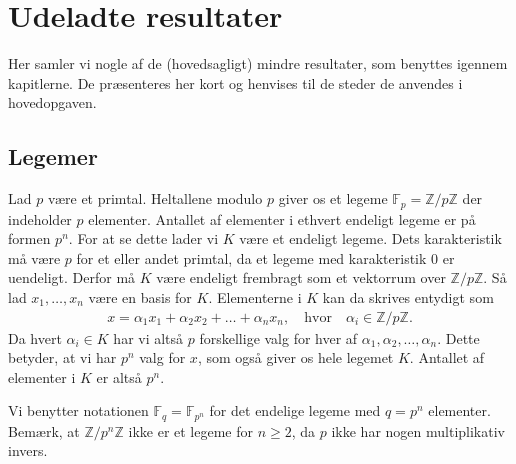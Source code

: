 \appendix

\chapter{Udeladte resultater}
Her samler vi nogle af de (hovedsagligt) mindre resultater, som benyttes igennem kapitlerne. De præsenteres her kort og henvises til de steder de anvendes i hovedopgaven.

\section{Legemer}
\label{appendiks_legemer}
Lad $p$ være et primtal. Heltallene modulo $p$ giver os et legeme $\mathbb{F}_p = \mathbb{Z}/p\mathbb{Z}$ der indeholder $p$ elementer. Antallet af elementer i ethvert endeligt legeme er på formen $p^n$. For at se dette lader vi $K$ være et endeligt legeme. Dets karakteristik må være $p$ for et eller andet primtal, da et legeme med karakteristik $0$ er uendeligt. Derfor må $K$ være endeligt frembragt som et vektorrum over $\mathbb{Z}/p\mathbb{Z}$. Så lad $x_1, \ldots, x_n$ være en basis for $K$. Elementerne i $K$ kan da skrives entydigt som
\begin{align*}
	x= \alpha_1 x_1 + \alpha_2 x_2 + \ldots + \alpha_n x_n, \quad \text{hvor} \quad \alpha_i \in \mathbb{Z}/p\mathbb{Z}.
\end{align*}
Da hvert $\alpha_i \in K$ har vi altså $p$ forskellige valg for hver af $\alpha_1, \alpha_2, \ldots, \alpha_n$. Dette betyder, at vi har $p^n$ valg for $x$, som også giver os hele legemet $K$. Antallet af elementer i $K$ er altså $p^n$. 

Vi benytter notationen $\mathbb{F}_q = \mathbb{F}_{p^n}$ for det endelige legeme med $q=p^n$ elementer. Bemærk, at $\mathbb{Z}/p^n \mathbb{Z}$ ikke er et legeme for $n \geq 2$, da $p$ ikke har nogen multiplikativ invers.

